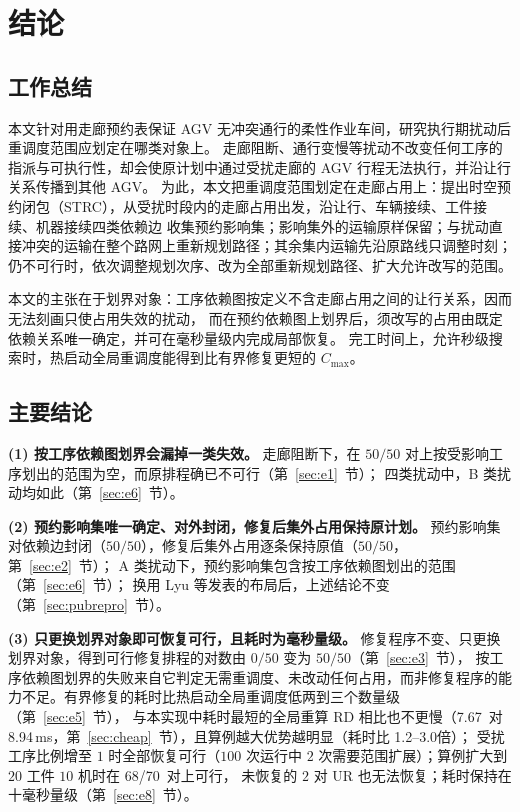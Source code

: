 \documentclass[manuscript,screen,review]{acmart}
\providecommand{\STRC}{\textsc{STRC}}
\newcommand{\NPairs}{50}
\newcommand{\PassMiss}{\NPairs/\NPairs}      %
\newcommand{\FeasRone}{0/\NPairs}            %
\newcommand{\FeasRtwo}{\NPairs/\NPairs}  %
\newcommand{\PassClosed}{\NPairs/\NPairs}    %
\newcommand{\PassInvar}{\NPairs/\NPairs}  %
\newcommand{\MsRedecode}{8.94}       %
\newcommand{\MsCheapRtwo}{7.67}      %
\newcommand{\ScalePairs}{70}
\newcommand{\ScaleJobsHi}{20}
\newcommand{\ScaleMachHi}{10}
\newcommand{\ScaleRatioLo}{1.2}  %
\newcommand{\ScaleRatioHi}{3.0}  %
\newcommand{\ScaleFeasAll}{68/\ScalePairs}     %
\begin{document}
\section{结论}
\label{sec:conclusion}

\subsection{工作总结}

本文针对用走廊预约表保证 AGV 无冲突通行的柔性作业车间，研究执行期扰动后重调度范围应划定在哪类对象上。
走廊阻断、通行变慢等扰动不改变任何工序的指派与可执行性，却会使原计划中通过受扰走廊的 AGV 行程无法执行，并沿让行关系传播到其他 AGV。
为此，本文把重调度范围划定在走廊占用上：提出时空预约闭包（\STRC{}），从受扰时段内的走廊占用出发，沿让行、车辆接续、工件接续、机器接续四类依赖边
收集预约影响集；影响集外的运输原样保留；与扰动直接冲突的运输在整个路网上重新规划路径；其余集内运输先沿原路线只调整时刻；
仍不可行时，依次调整规划次序、改为全部重新规划路径、扩大允许改写的范围。

本文的主张在于划界对象：工序依赖图按定义不含走廊占用之间的让行关系，因而无法刻画只使占用失效的扰动，
而在预约依赖图上划界后，须改写的占用由既定依赖关系唯一确定，并可在毫秒量级内完成局部恢复。
完工时间上，允许秒级搜索时，热启动全局重调度能得到比有界修复更短的 \(C_{\max}\)。

\subsection{主要结论}

\textbf{(1) 按工序依赖图划界会漏掉一类失效。}
走廊阻断下，在 \(\PassMiss\) 对上按受影响工序划出的范围为空，而原排程确已不可行（第~\ref{sec:e1}~节）；
四类扰动中，B 类扰动均如此（第~\ref{sec:e6}~节）。

\textbf{(2) 预约影响集唯一确定、对外封闭，修复后集外占用保持原计划。}
预约影响集对依赖边封闭（\(\PassClosed\)），修复后集外占用逐条保持原值（\(\PassInvar\)，第~\ref{sec:e2}~节）；
A 类扰动下，预约影响集包含按工序依赖图划出的范围（第~\ref{sec:e6}~节）；
换用 Lyu 等发表的布局后，上述结论不变（第~\ref{sec:pubrepro}~节）。

\textbf{(3) 只更换划界对象即可恢复可行，且耗时为毫秒量级。}
修复程序不变、只更换划界对象，得到可行修复排程的对数由 \(\FeasRone\) 变为 \(\FeasRtwo\)（第~\ref{sec:e3}~节），
按工序依赖图划界的失败来自它判定无需重调度、未改动任何占用，而非修复程序的能力不足。有界修复的耗时比热启动全局重调度低两到三个数量级（第~\ref{sec:e5}~节），
与本实现中耗时最短的全局重算 RD 相比也不更慢（\MsCheapRtwo\ 对 \MsRedecode\,ms，第~\ref{sec:cheap}~节），且算例越大优势越明显（耗时比 \ScaleRatioLo--\ScaleRatioHi 倍）；
受扰工序比例增至 \(1\) 时全部恢复可行（\(100\) 次运行中 \(2\) 次需要范围扩展）；算例扩大到 \(\ScaleJobsHi\) 工件 \(\ScaleMachHi\) 机时在 \ScaleFeasAll\ 对上可行，
未恢复的 \(2\) 对 UR 也无法恢复；耗时保持在十毫秒量级（第~\ref{sec:e8}~节）。
\end{document}
